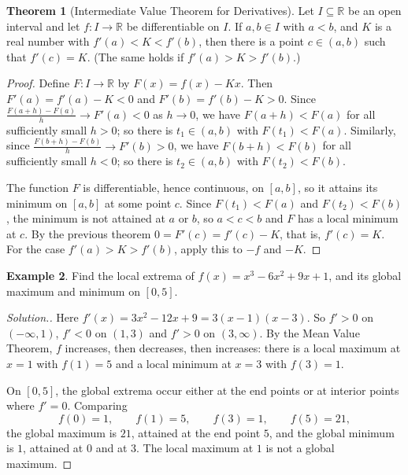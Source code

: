 \documentclass[11pt,a4paper]{article}
\numberwithin{equation}{section}
\theoremstyle{definition}
\newtheorem{thm}{Theorem}[subsection]
\newtheorem{exa}[thm]{Example}
\newenvironment{solution}
  {\renewcommand{\qedsymbol}{}\begin{proof}[\textit{Solution}.]}
  {\end{proof}}
\begin{document}
\begin{thm}[Intermediate Value Theorem for Derivatives]
Let $I\subseteq \mathbb{R}$ be an open interval and let $f: I \longrightarrow \mathbb{R}$ be differentiable on $I$. If $a, b\in I$ with $a<b$, and $K$ is a real number with $f'(a) < K < f'(b)$, then there is a point $c\in (a,b)$ such that $f'(c) = K$. (The same holds if $f'(a) > K > f'(b)$.)
\end{thm}

\begin{proof}
Define $F: I\longrightarrow \mathbb{R}$ by $F(x) = f(x) - Kx$. Then $F'(a) = f'(a) - K < 0$ and $F'(b) = f'(b) - K > 0$. Since $\frac{F(a  + h) - F(a)}{h} \longrightarrow F'(a)<0$ as $h \longrightarrow 0$, we have $F(a+h) < F(a)$ for all sufficiently small $h>0$; so there is $t_1\in(a,b)$ with $F(t_1)<F(a)$. Similarly, since $\frac{F(b  + h) - F(b)}{h} \longrightarrow F'(b)>0$, we have $F(b+h) < F(b)$ for all sufficiently small $h<0$; so there is $t_2\in(a,b)$ with $F(t_2)<F(b)$.

The function $F$ is differentiable, hence continuous, on $[a,b]$, so it attains its minimum on $[a,b]$ at some point $c$. Since $F(t_1)<F(a)$ and $F(t_2)<F(b)$, the minimum is not attained at $a$ or $b$, so $a<c<b$ and $F$ has a local minimum at $c$. By the previous theorem $0 = F'(c) = f'(c) - K$, that is, $f'(c) = K$. For the case $f'(a) > K > f'(b)$, apply this to $-f$ and $-K$.
\end{proof}

\begin{exa}
Find the local extrema of $f(x) = x^3 - 6x^2 + 9x + 1$, and its global maximum and minimum on $[0,5]$.
\end{exa}

\begin{solution}
Here $f'(x) = 3x^2 - 12x + 9 = 3(x-1)(x-3)$. So $f' > 0$ on $(-\infty,1)$, $f'<0$ on $(1,3)$ and $f'>0$ on $(3,\infty)$. By the Mean Value Theorem, $f$ increases, then decreases, then increases: there is a local maximum at $x=1$ with $f(1) = 5$ and a local minimum at $x=3$ with $f(3) = 1$.

On $[0,5]$, the global extrema occur either at the end points or at interior points where $f' = 0$. Comparing
$$f(0) = 1,\qquad f(1) = 5,\qquad f(3) = 1,\qquad f(5) = 21,$$
the global maximum is $21$, attained at the end point $5$, and the global minimum is $1$, attained at $0$ and at $3$. The local maximum at $1$ is not a global maximum.
\end{solution}
\end{document}
